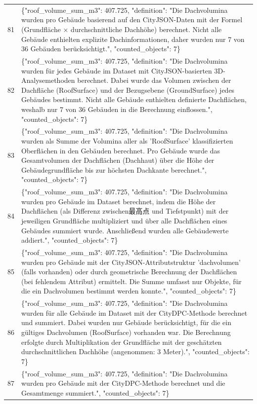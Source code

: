 \documentclass[a4paper,11pt]{article}
\begin{document}
\begin{table}[ht]
\begin{tabular}{r p{12cm}}
81 & \{"roof\_volume\_sum\_m3": 407.725, "definition": "Die Dachvolumina wurden pro Gebäude basierend auf den CityJSON-Daten mit der Formel (Grundfläche × durchschnittliche Dachhöhe) berechnet. Nicht alle Gebäude enthielten explizite Dachinformationen, daher wurden nur 7 von 36 Gebäuden berücksichtigt.", "counted\_objects": 7\} \\
82 & \{"roof\_volume\_sum\_m3": 407.725, "definition": "Die Dachvolumina wurden für jedes Gebäude im Dataset mit CityJSON-basierten 3D-Analysemethoden berechnet. Dabei wurde das Volumen zwischen der Dachfläche (RoofSurface) und der Bezugsebene (GroundSurface) jedes Gebäudes bestimmt. Nicht alle Gebäude enthielten definierte Dachflächen, weshalb nur 7 von 36 Gebäuden in die Berechnung einflossen.", "counted\_objects": 7\} \\
83 & \{"roof\_volume\_sum\_m3": 407.725, "definition": "Die Dachvolumina wurden als Summe der Volumina aller als 'RoofSurface' klassifizierten Oberflächen in den Gebäuden berechnet. Pro Gebäude wurde das Gesamtvolumen der Dachflächen (Dachhaut) über die Höhe der Gebäudegrundfläche bis zur höchsten Dachkante berechnet.", "counted\_objects": 7\} \\
84 & \{"roof\_volume\_sum\_m3": 407.725, "definition": "Die Dachvolumina wurden pro Gebäude im Dataset berechnet, indem die Höhe der Dachflächen (als Differenz zwischen最高点 und Tiefstpunkt) mit der jeweiligen Grundfläche multipliziert und über alle Dachflächen eines Gebäudes summiert wurde. Anschließend wurden alle Gebäudewerte addiert.", "counted\_objects": 7\} \\
85 & \{"roof\_volume\_sum\_m3": 407.725, "definition": "Die Dachvolumina wurden pro Gebäude mit der CityJSON-Attributstruktur 'dachvolumen' (falls vorhanden) oder durch geometrische Berechnung der Dachflächen (bei fehlendem Attribut) ermittelt. Die Summe umfasst nur Objekte, für die ein Dachvolumen bestimmt werden konnte.", "counted\_objects": 7\} \\
86 & \{"roof\_volume\_sum\_m3": 407.725, "definition": "Die Dachvolumina wurden für alle Gebäude im Dataset mit der CityDPC-Methode berechnet und summiert. Dabei wurden nur Gebäude berücksichtigt, für die ein gültiges Dachvolumen (RoofSurface) vorhanden war. Die Berechnung erfolgte durch Multiplikation der Grundfläche mit der geschätzten durchschnittlichen Dachhöhe (angenommen: 3 Meter).", "counted\_objects": 7\} \\
87 & \{"roof\_volume\_sum\_m3": 407.725, "definition": "Die Dachvolumina wurden pro Gebäude mit der CityDPC-Methode berechnet und die Gesamtmenge summiert.", "counted\_objects": 7\} \\

\end{tabular}
\end{table}
\end{document}

